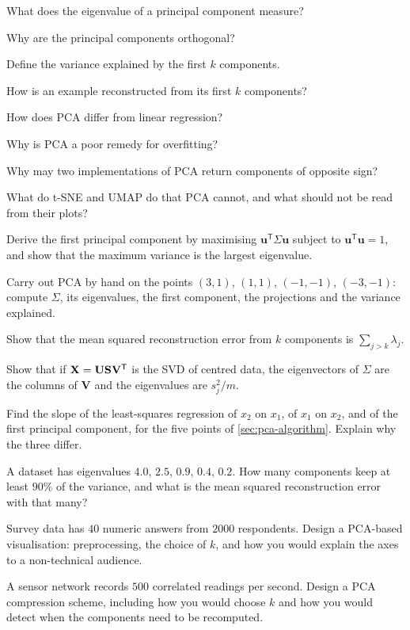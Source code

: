 \sq What does the eigenvalue of a principal component measure?

\sq Why are the principal components orthogonal?

\sq Define the variance explained by the first $k$ components.

\sq How is an example reconstructed from its first $k$ components?

\sq How does PCA differ from linear regression?

\sq Why is PCA a poor remedy for overfitting?

\sq Why may two implementations of PCA return components of opposite sign?

\sq What do t-SNE and UMAP do that PCA cannot, and what should not be read from
their plots?


\ap Derive the first principal component by maximising $\mathbf{u}^{\mathsf T}
\Sigma\mathbf{u}$ subject to $\mathbf{u}^{\mathsf T}\mathbf{u} = 1$, and show that
the maximum variance is the largest eigenvalue.

\ap Carry out PCA by hand on the points $(3,1)$, $(1,1)$, $(-1,-1)$, $(-3,-1)$:
compute $\Sigma$, its eigenvalues, the first component, the projections and the
variance explained.

\ap Show that the mean squared reconstruction error from $k$ components is
$\sum_{j>k}\lambda_j$.

\ap Show that if $\mathbf{X} = \mathbf{U}\mathbf{S}\mathbf{V}^{\mathsf T}$ is the SVD of
centred data, the eigenvectors of $\Sigma$ are the columns of $\mathbf{V}$ and the
eigenvalues are $s_j^2/m$.

\ap Find the slope of the least-squares regression of $x_2$ on $x_1$, of $x_1$ on
$x_2$, and of the first principal component, for the five points of
\cref{sec:pca-algorithm}. Explain why the three differ.

\ap A dataset has eigenvalues $4.0$, $2.5$, $0.9$, $0.4$, $0.2$. How many
components keep at least $90\%$ of the variance, and what is the mean squared
reconstruction error with that many?


\dpr Survey data has $40$ numeric answers from $2000$ respondents. Design a
PCA-based visualisation: preprocessing, the choice of $k$, and how you would explain
the axes to a non-technical audience.

\dpr A sensor network records $500$ correlated readings per second. Design a PCA
compression scheme, including how you would choose $k$ and how you would detect when
the components need to be recomputed.

